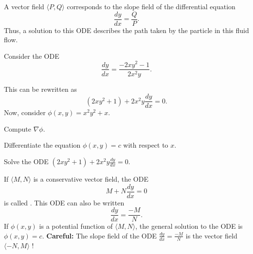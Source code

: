 \begin{applicationActivities}


\begin{observation}
A vector field \(\langle P,Q\rangle\) corresponds to the slope field of the differential equation \[\frac{dy}{dx}=\frac{Q}{P}.\]
\vfill
Thus, a solution to this ODE describes the path taken by the particle in this fluid flow.

\begin{center}\end{center}


\end{observation}

\begin{activity}{10}
Consider the  ODE \[\frac{dy}{dx} = \frac{-2xy^2-1}{2x^2y}.\]

This can be rewritten as \[ (2xy^2+1) + 2x^2y \frac{dy}{dx} = 0 .\]
\vfill
Now, consider \(\phi(x,y)=x^2y^2+x \).  
\begin{subactivity}
Compute \(\nabla \phi \).
\end{subactivity}
\begin{subactivity}
Differentiate the equation \(\phi(x,y)=c\) with respect to \(x\).
\end{subactivity}
\begin{subactivity}
Solve the ODE \( (2xy^2+1) + 2x^2y \frac{dy}{dx} = 0 \).
\end{subactivity}
\end{activity}

\begin{definition}
If \(\langle M,N\rangle\) is a conservative vector field, the ODE
\[M + N \frac{dy}{dx} = 0 \]
is called .  This ODE can also be written
\[\frac{dy}{dx} = \frac{ -M}{N} .\]
If \(\phi(x,y)\) is a potential function of \(\langle M,N\rangle\), the general solution to the
ODE is \(\phi(x,y)=c.\)
\vfill
\textbf{Careful: } The slope field of the ODE \(\frac{dy}{dx} = \frac{ -M}{N} \) is the vector field \(\langle -N,M\rangle\) !
\end{definition}


\end{applicationActivities}
